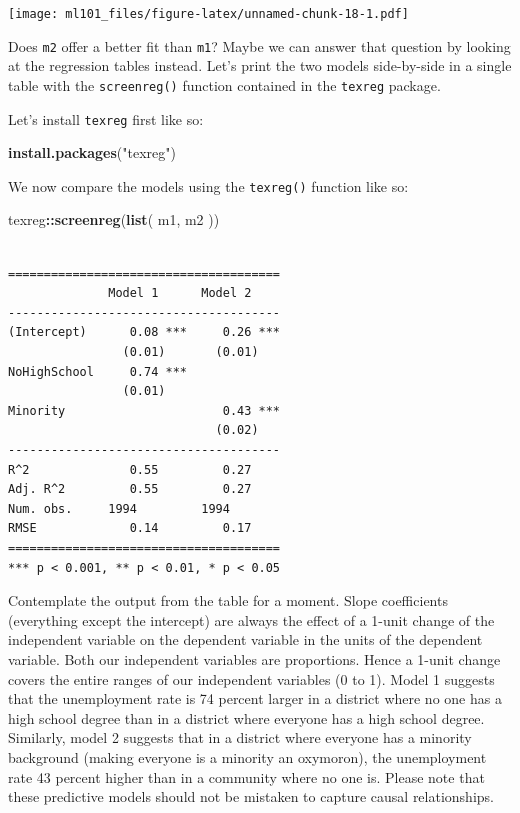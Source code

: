 \documentclass[]{article}
\newenvironment{Shaded}{\begin{snugshade}}{\end{snugshade}}
\newcommand{\KeywordTok}[1]{\textcolor[rgb]{0.13,0.29,0.53}{\textbf{#1}}}
\newcommand{\NormalTok}[1]{#1}
\newcommand{\OperatorTok}[1]{\textcolor[rgb]{0.81,0.36,0.00}{\textbf{#1}}}
\newcommand{\StringTok}[1]{\textcolor[rgb]{0.31,0.60,0.02}{#1}}
\begin{document}
\texttt{[image: ml101\_files/figure-latex/unnamed-chunk-18-1.pdf]}

Does \texttt{m2} offer a better fit than \texttt{m1}? Maybe we can answer that question by looking at the regression tables instead. Let's print the two models side-by-side in a single table with the \texttt{screenreg()} function contained in the \texttt{texreg} package.

Let's install \texttt{texreg} first like so:

\begin{Shaded}
\begin{Highlighting}[]
\KeywordTok{install.packages}\NormalTok{(}\StringTok{"texreg"}\NormalTok{)}
\end{Highlighting}
\end{Shaded}

We now compare the models using the \texttt{texreg()} function like so:

\begin{Shaded}
\begin{Highlighting}[]
\NormalTok{texreg}\OperatorTok{::}\KeywordTok{screenreg}\NormalTok{(}\KeywordTok{list}\NormalTok{( m1, m2 ))}
\end{Highlighting}
\end{Shaded}

\begin{verbatim}

======================================
              Model 1      Model 2    
--------------------------------------
(Intercept)      0.08 ***     0.26 ***
                (0.01)       (0.01)   
NoHighSchool     0.74 ***             
                (0.01)                
Minority                      0.43 ***
                             (0.02)   
--------------------------------------
R^2              0.55         0.27    
Adj. R^2         0.55         0.27    
Num. obs.     1994         1994       
RMSE             0.14         0.17    
======================================
*** p < 0.001, ** p < 0.01, * p < 0.05
\end{verbatim}

Contemplate the output from the table for a moment. Slope coefficients (everything except the intercept) are always the effect of a 1-unit change of the independent variable on the dependent variable in the units of the dependent variable. Both our independent variables are proportions. Hence a 1-unit change covers the entire ranges of our independent variables (0 to 1). Model 1 suggests that the unemployment rate is 74 percent larger in a district where no one has a high school degree than in a district where everyone has a high school degree. Similarly, model 2 suggests that in a district where everyone has a minority background (making everyone is a minority an oxymoron), the unemployment rate 43 percent higher than in a community where no one is. Please note that these predictive models should not be mistaken to capture causal relationships.
\end{document}
